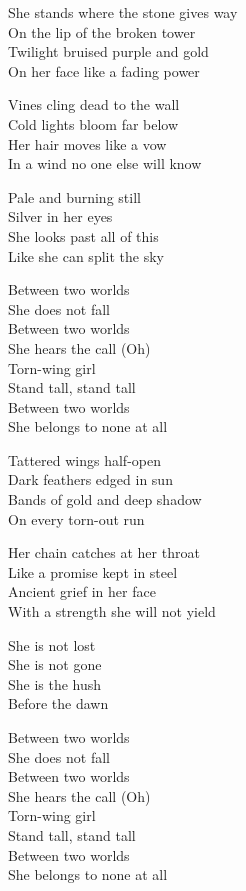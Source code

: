 \begin{lyrics}
She stands where the stone gives way\\
On the lip of the broken tower\\
Twilight bruised purple and gold\\
On her face like a fading power

Vines cling dead to the wall\\
Cold lights bloom far below\\
Her hair moves like a vow\\
In a wind no one else will know

Pale and burning still\\
Silver in her eyes\\
She looks past all of this\\
Like she can split the sky

Between two worlds\\
She does not fall\\
Between two worlds\\
She hears the call
(Oh)\\
Torn-wing girl\\
Stand tall, stand tall\\
Between two worlds\\
She belongs to none at all

Tattered wings half-open\\
Dark feathers edged in sun\\
Bands of gold and deep shadow\\
On every torn-out run

Her chain catches at her throat\\
Like a promise kept in steel\\
Ancient grief in her face\\
With a strength she will not yield

She is not lost\\
She is not gone\\
She is the hush\\
Before the dawn

Between two worlds\\
She does not fall\\
Between two worlds\\
She hears the call
(Oh)\\
Torn-wing girl\\
Stand tall, stand tall\\
Between two worlds\\
She belongs to none at all


\end{lyrics}

